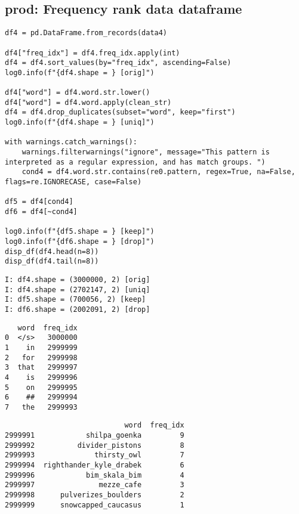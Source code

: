 \documentclass[a4paper,10pt,onecolumn,oneside,openright]{article}
\begin{document}
\subsection{prod: Frequency rank data dataframe}
\label{sec:org4fb9a97}
\begin{verbatim}
df4 = pd.DataFrame.from_records(data4)

df4["freq_idx"] = df4.freq_idx.apply(int)
df4 = df4.sort_values(by="freq_idx", ascending=False)
log0.info(f"{df4.shape = } [orig]")

df4["word"] = df4.word.str.lower()
df4["word"] = df4.word.apply(clean_str)
df4 = df4.drop_duplicates(subset="word", keep="first")
log0.info(f"{df4.shape = } [uniq]")

with warnings.catch_warnings():
    warnings.filterwarnings("ignore", message="This pattern is interpreted as a regular expression, and has match groups. ")
    cond4 = df4.word.str.contains(re0.pattern, regex=True, na=False, flags=re.IGNORECASE, case=False)

df5 = df4[cond4]
df6 = df4[~cond4]

log0.info(f"{df5.shape = } [keep]")
log0.info(f"{df6.shape = } [drop]")
disp_df(df4.head(n=8))
disp_df(df4.tail(n=8))
\end{verbatim}

\begin{verbatim}
I: df4.shape = (3000000, 2) [orig]
I: df4.shape = (2702147, 2) [uniq]
I: df5.shape = (700056, 2) [keep]
I: df6.shape = (2002091, 2) [drop]
\end{verbatim}
\begin{verbatim}
   word  freq_idx
0  </s>   3000000
1    in   2999999
2   for   2999998
3  that   2999997
4    is   2999996
5    on   2999995
6    ##   2999994
7   the   2999993
\end{verbatim}
\begin{verbatim}
                            word  freq_idx
2999991            shilpa_goenka         9
2999992          divider_pistons         8
2999993              thirsty_owl         7
2999994  righthander_kyle_drabek         6
2999996            bim_skala_bim         4
2999997               mezze_cafe         3
2999998      pulverizes_boulders         2
2999999      snowcapped_caucasus         1
\end{verbatim}
\end{document}

